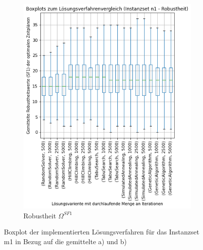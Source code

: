 \begin{figure}[H]
\begin{subfigure}{0.497\linewidth}
        \includegraphics[width=\linewidth]{assets/img/05_Evaluation/Boxplot_n1_Robust.png}
        \caption{Robustheit $\Omega^{SF1}$}
        \label{fig:evaluation_solver_n1_robust_boxplot}
    \end{subfigure}
    
    \caption{Boxplot der implementierten Lösungsverfahren für das Instanzset m1 in Bezug auf die gemittelte a) und b)}
\end{figure}
